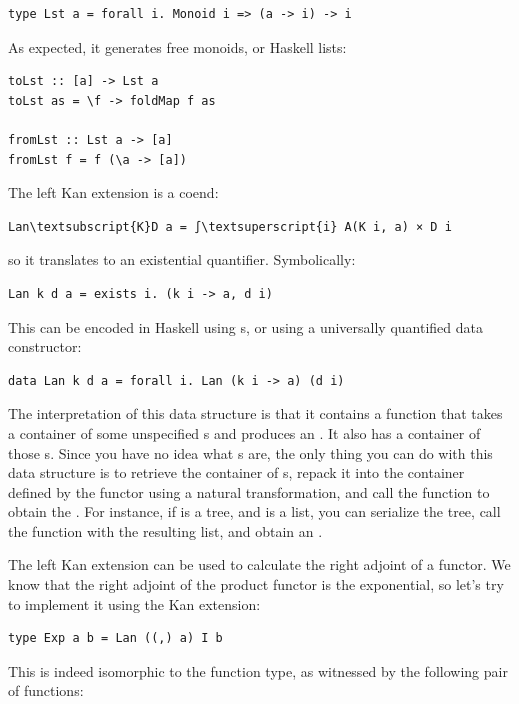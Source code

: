 \begin{Verbatim}[commandchars=\\\{\}]
type Lst a = forall i. Monoid i => (a -> i) -> i
\end{Verbatim}
As expected, it generates free monoids, or Haskell lists:

\begin{Verbatim}
toLst :: [a] -> Lst a
toLst as = \f -> foldMap f as

fromLst :: Lst a -> [a]
fromLst f = f (\a -> [a])
\end{Verbatim}
The left Kan extension is a coend:

\begin{Verbatim}[commandchars=\\\{\}]
Lan\textsubscript{K}D a = ∫\textsuperscript{i} A(K i, a) × D i
\end{Verbatim}
so it translates to an existential quantifier. Symbolically:

\begin{Verbatim}[commandchars=\\\{\}]
Lan k d a = exists i. (k i -> a, d i)
\end{Verbatim}
This can be encoded in Haskell using s, or using a universally
quantified data constructor:

\begin{Verbatim}[commandchars=\\\{\}]
data Lan k d a = forall i. Lan (k i -> a) (d i)
\end{Verbatim}
The interpretation of this data structure is that it contains a function
that takes a container of some unspecified s and produces an
. It also has a container of those s. Since you have
no idea what s are, the only thing you can do with this data
structure is to retrieve the container of s, repack it into
the container defined by the functor  using a natural
transformation, and call the function to obtain the . For
instance, if  is a tree, and  is a list, you can
serialize the tree, call the function with the resulting list, and
obtain an .

The left Kan extension can be used to calculate the right adjoint of a
functor. We know that the right adjoint of the product functor is the
exponential, so let's try to implement it using the Kan extension:

\begin{Verbatim}[commandchars=\\\{\}]
type Exp a b = Lan ((,) a) I b
\end{Verbatim}
This is indeed isomorphic to the function type, as witnessed by the
following pair of functions:

